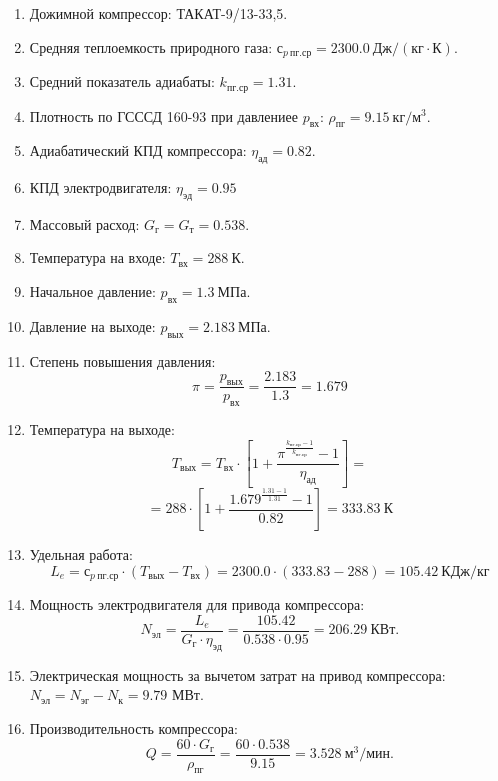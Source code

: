 \documentclass[a4paper,10pt]{article}
\begin{document}
    
\begin{enumerate}
    \item Дожимной компрессор: ТАКАТ-9/13-33,5.
    \item Средняя теплоемкость природного газа: $с_{p\ пг.ср} = 2300.0\ Дж/(кг \cdot К) $.
    \item Средний показатель адиабаты: $k_{пг.ср} = 1.31$.
    \item Плотность по ГСССД 160-93 при давлениее $p_{вх}$: $\rho_{пг} = 9.15\ кг/м^3$.
    \item Адиабатический КПД компрессора: $\eta_{ад} = 0.82$.
    \item КПД электродвигателя: $\eta_{эд} = 0.95$
    \item Массовый расход: $G_{г} = G_{т} = 0.538$.
    \item Температура на входе: $T_{вх} = 288\ К$.
    \item Начальное давление: $p_{вх} = 1.3\ МПа$.
    \item Давление на выходе: $p_{вых} = 2.183\ МПа$.
    \item Степень повышения давления:
    \[
        \pi = \frac{p_{вых}}{p_{вх}} = \frac{2.183}
        {1.3} =
        1.679
    \]
    \item Температура на выходе:
    \[
        T_{вых} = T_{вх} \cdot \left[
                1 + \frac{
                        \pi^{\frac{k_{пг.ср} - 1}{k_{пг.ср}}} - 1
                    }{ \eta_{ад} }
        \right] =
    \]
    \[
        = 288 \cdot \left[
                1 + \frac{
                        1.679 ^
                        {\frac{1.31 - 1}{1.31}} - 1
                    }{ 0.82 }
        \right] =
        333.83\ К
    \]
    \item Удельная работа:
    \[
        L_e = с_{p\ пг.ср} \cdot ( T_{вых} - T_{вх} ) =
                2300.0 \cdot ( 333.83 - 288 ) =
        105.42\ КДж/кг
    \]
    \item Мощность электродвигателя для привода компрессора:
    \[
        N_{эл} = \frac{L_e}{G_{г} \cdot \eta_{эд}} =
        \frac{105.42}
        {0.538 \cdot 0.95 } =
        206.29\ КВт.
    \]
    \item Электрическая мощность за вычетом затрат на привод компрессора: $N_{эл} = N_{эг} - N_{к} = 9.79$ МВт.
    \item Производительность компрессора:
    \[
        Q = \frac{60 \cdot G_г}{\rho_{пг}} = \frac{60 \cdot 0.538}
        {9.15} = 3.528\ м^{3}/мин.
    \]
\end{enumerate}
\end{document}

